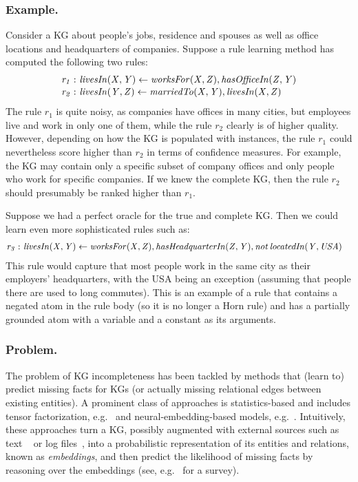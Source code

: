 %
\subsubsection{Example.}
Consider a KG about people's jobs, residence and
spouses as well as office locations and headquarters of companies.
Suppose a rule learning method has computed the following two rules:
{\small
\begin{align}
	\label{eq:ex-rule-1}
\mathit{r_1 :\ }& \mathit{livesIn(X,Y) \leftarrow worksFor(X,Z), hasOfficeIn(Z,Y)}\\[-.5ex]
	\label{eq:ex-rule-2}
\mathit{r_2 :\ }& \mathit{ livesIn(Y,Z) \leftarrow marriedTo(X,Y), livesIn(X,Z)}
\end{align}}
The rule $r_1$ is quite noisy, as companies have offices in many cities, 
but employees live and work in only one of them, while
the rule $r_2$ clearly is of higher quality. 
However, depending on how the KG is populated with instances,
the rule $r_1$ could nevertheless score higher than $r_2$ in terms of confidence
measures. 
For example, the KG may contain only a specific subset of company offices
and only people who work for specific companies. 
If we knew the complete KG, then the rule $r_2$
should presumably be ranked higher than $r_1$.

Suppose we had a perfect oracle for the true and complete KG. Then
we could learn even more sophisticated rules such as:
 {\small
 \begin{align*}
\mathit{r_3 :\ } &\mathit{livesIn(X,Y) \leftarrow worksFor(X,Z), hasHeadquarterIn(Z,Y), \mathit{not}\, locatedIn(Y,USA)}
\end{align*}}
This rule would capture that most people work in the same city
as their employers' headquarters, with the USA being an exception
(assuming that people there are used to long commutes).
This is an example of a rule that contains a negated atom in
the rule body (so it is no longer a Horn rule) and has a partially
grounded atom with a variable and a constant as its arguments.



\subsubsection{Problem.}
The problem of  KG incompleteness has been tackled by methods that
(learn to) predict missing facts for KGs 
(or actually missing relational edges between
existing entities).
A prominent class of approaches is statistics-based and includes
tensor factorization, e.g.~\cite{conf/icml/NickelTK11} and neural-embedding-based models, e.g.~\cite{Bordes:NIPS2013,DBLP:conf/aaai/NickelRP16}.
Intuitively, these approaches turn a KG, possibly augmented with
external sources such as 
text
~\cite{DBLP:conf/aaai/0005HMZ17}
or log files~\cite{Ringsquandl-2018-eswc}, 
into a probabilistic representation
of its entities and relations,
known as \emph{embeddings}, 
and then predict the likelihood of  
missing facts by reasoning over the embeddings
(see, e.g.~\cite{DBLP:journals/tkde/WangMWG17} for a survey). 

